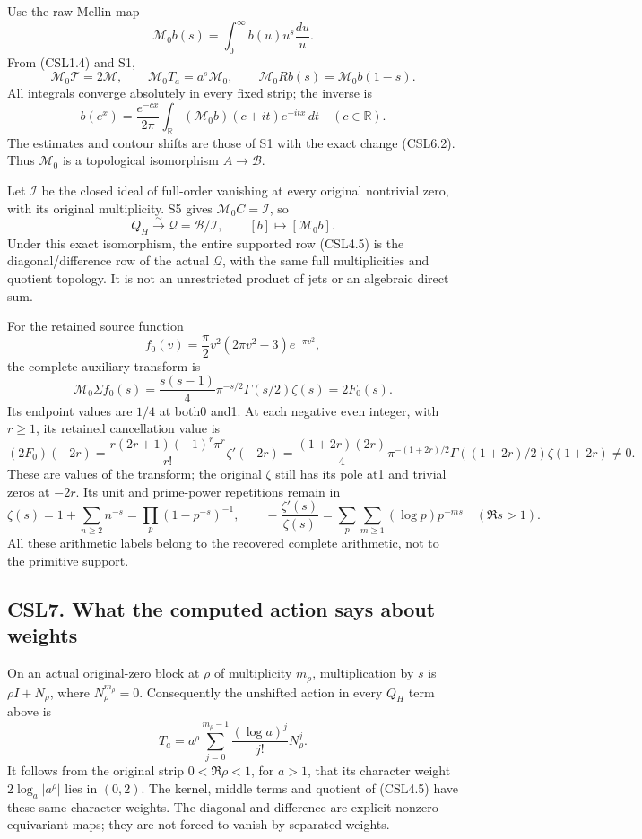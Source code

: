 Use the raw Mellin map \[
\mathcal M_0b(s)=\int_0^\infty b(u)u^s\frac{du}{u}.
\tag{CSL6.1}
\] From (CSL1.4) and S1, \[
\mathcal M_0\mathcal T=2\mathcal M,\qquad
\mathcal M_0T_a=a^s\mathcal M_0,\qquad
\mathcal M_0R b(s)=\mathcal M_0b(1-s).
\tag{CSL6.2}
\] All integrals converge absolutely in every fixed strip; the inverse
is \[
b(e^x)=\frac{e^{-cx}}{2\pi}\int_{\mathbb R}
(\mathcal M_0b)(c+it)e^{-itx}\,dt
\quad(c\in\mathbb R).
\tag{CSL6.3}
\] The estimates and contour shifts are those of S1 with the exact
change (CSL6.2). Thus \(\mathcal M_0\) is a topological isomorphism
\(A\to\mathcal B\).

Let \(\mathcal I\) be the closed ideal of full-order vanishing at every
original nontrivial zero, with its original multiplicity. S5 gives
\(\mathcal M_0 C=\mathcal I\), so \[
Q_H\xrightarrow{\sim}\mathcal Q=\mathcal B/\mathcal I,
\qquad[b]\longmapsto[\mathcal M_0b].
\tag{CSL6.4}
\] Under this exact isomorphism, the entire supported row (CSL4.5) is
the diagonal/difference row of the actual \(\mathcal Q\), with the same
full multiplicities and quotient topology. It is not an unrestricted
product of jets or an algebraic direct sum.

For the retained source function \[
f_0(v)=\frac\pi2v^2(2\pi v^2-3)e^{-\pi v^2},
\] the complete auxiliary transform is \[
\mathcal M_0\Sigma f_0(s)
=\frac{s(s-1)}4\pi^{-s/2}\Gamma(s/2)\zeta(s)=2F_0(s).
\tag{CSL6.5}
\] Its endpoint values are \(1/4\) at both0 and1. At each negative even
integer, with \(r\ge1\), its retained cancellation value is \[
(2F_0)(-2r)
=\frac{r(2r+1)(-1)^r\pi^r}{r!}\zeta'(-2r)
=\frac{(1+2r)(2r)}4\pi^{-(1+2r)/2}
\Gamma((1+2r)/2)\zeta(1+2r)\ne0.
\tag{CSL6.6}
\] These are values of the transform; the original \(\zeta\) still has
its pole at1 and trivial zeros at \(-2r\). Its unit and prime-power
repetitions remain in \[
\zeta(s)=1+\sum_{n\ge2}n^{-s}
=\prod_p(1-p^{-s})^{-1},\qquad
-\frac{\zeta'(s)}{\zeta(s)}
=\sum_p\sum_{m\ge1}(\log p)p^{-ms}
\quad(\Re s>1).
\tag{CSL6.7}
\] All these arithmetic labels belong to the recovered complete
arithmetic, not to the primitive support.

\subsection{CSL7. What the computed action says about
weights}\label{csl7.-what-the-computed-action-says-about-weights}

On an actual original-zero block at \(\rho\) of multiplicity \(m_\rho\),
multiplication by \(s\) is \(\rho I+N_\rho\), where
\(N_\rho^{m_\rho}=0\). Consequently the unshifted action in every
\(Q_H\) term above is \[
T_a=a^\rho\sum_{j=0}^{m_\rho-1}
\frac{(\log a)^j}{j!}N_\rho^j.
\tag{CSL7.1}
\] It follows from the original strip \(0<\Re\rho<1\), for \(a>1\), that
its character weight \(2\log_a|a^\rho|\) lies in \((0,2)\). The kernel,
middle terms and quotient of (CSL4.5) have these same character weights.
The diagonal and difference are explicit nonzero equivariant maps; they
are not forced to vanish by separated weights.

